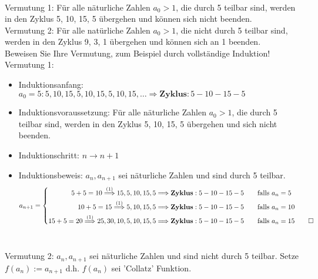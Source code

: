\documentclass{article}
\begin{document}
\begin{flushleft}
$$\begin{aligned}
\end{aligned}
$$
Vermutung 1: Für alle näturliche Zahlen $a_0 > 1$, die durch 5 teilbar sind, werden in den Zyklus 5, 10, 15, 5 
übergehen und können sich nicht beenden.
\newline\\
Vermutung 2: Für alle natürliche Zahlen $a_0 > 1$, die nicht durch 5 teilbar sind, werden in den Zyklus 9, 3, 1 
übergehen und können sich an 1 beenden.
\newline \\
Beweisen Sie Ihre Vermutung, zum Beispiel durch vollständige Induktion!
\newline
Vermutung 1:
\begin{itemize}
    \item Induktionsanfang: $a_0 = 5: 5, 10, 15, 5, 10, 15, 5, 10, 15,\dots \Longrightarrow \textbf{Zyklus}: 5-10-15-5$ \\
    \item Induktionsvoraussetzung: Für alle näturliche Zahlen $a_0 > 1$, die durch 5 teilbar sind, werden in den Zyklus 5, 10, 15, 5 
    übergehen und sich nicht beenden.
    \item Induktionschritt: $n \longrightarrow n+1$ 
    \item Induktionsbeweis: $a_n, a_{n + 1}$ sei näturliche Zahlen und sind durch 5 teilbar. \\
    $$ a_{n + 1} = \left\{
    \begin{aligned}
        5 + 5 = 10 \overset{(1)}{\Longrightarrow} 15, 5, 10, 15, 5 \Longrightarrow \textbf{Zyklus}: 5-10-15-5 
        &\qquad\text{falls } a_n = 5 \\
        10 + 5 = 15 \overset{(1)}{\Longrightarrow} 5, 10, 15, 5 \Longrightarrow \textbf{Zyklus}: 5-10-15-5 
        &\qquad\text{falls } a_n = 10 \\
        15 + 5 = 20  \overset{(1)}{\Longrightarrow} 25, 30, 10, 5, 10, 15, 5 \Longrightarrow \textbf{Zyklus}: 5-10-15-5 
        &\qquad\text{falls } a_n = 15 \qed
    \end{aligned}
    \right.
    $$ \\
\end{itemize}
Vermutung 2:
$a_n, a_{n + 1}$ sei näturliche Zahlen und sind nicht durch 5 teilbar. Setze $f(a_n) := a_{n + 1}$ d.h. $f(a_n)$ sei 
’Collatz’ Funktion. 


\end{flushleft}
\end{document}
